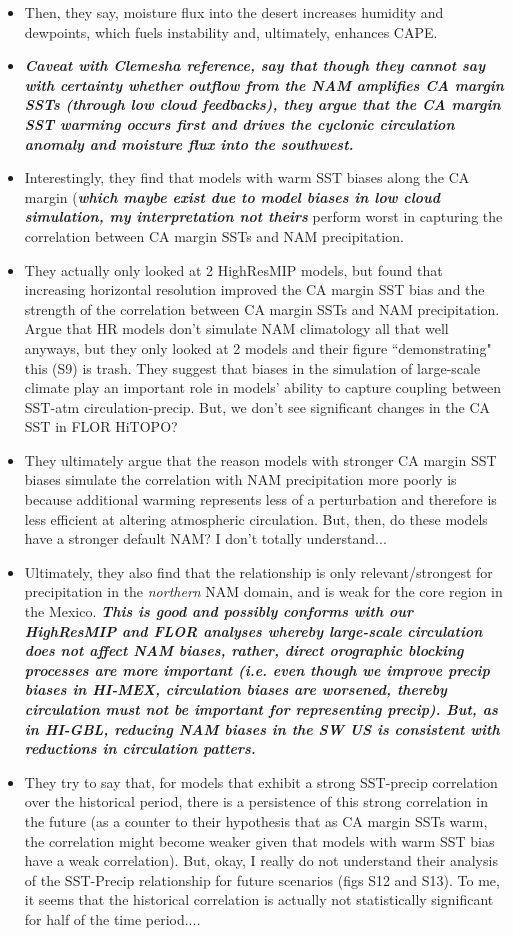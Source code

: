 \documentclass[11pt]{article}
\begin{document}
\begin{itemize}
    \item Then, they say, moisture flux into the desert increases humidity and dewpoints, which fuels instability and, ultimately, enhances CAPE. 
    \item \textbf{\textit{Caveat with Clemesha reference, say that though they cannot say with certainty whether outflow from the NAM amplifies CA margin SSTs (through low cloud feedbacks), they argue that the CA margin SST warming occurs first and drives the cyclonic circulation anomaly and moisture flux into the southwest.}}
    \item Interestingly, they find that models with warm SST biases along the CA margin (\textbf{\textit{which maybe exist due to model biases in low cloud simulation, my interpretation not theirs}} perform worst in capturing the correlation between CA margin SSTs and NAM precipitation.
    \item They actually only looked at 2 HighResMIP models, but found that increasing horizontal resolution improved the CA margin SST bias and the strength of the correlation between CA margin SSTs and NAM precipitation. Argue that HR models don't simulate NAM climatology all that well anyways, but they only looked at 2 models and their figure ``demonstrating" this (S9) is trash. They suggest that biases in the simulation of large-scale climate play an important role in models' ability to capture coupling between SST-atm circulation-precip. But, we don't see significant changes in the CA SST in FLOR HiTOPO?
    \item They ultimately argue that the reason models with stronger CA margin SST biases simulate the correlation with NAM precipitation more poorly is because additional warming represents less of a perturbation and therefore is less efficient at altering atmospheric circulation. But, then, do these models have a stronger default NAM? I don't totally understand...
    \item Ultimately, they also find that the relationship is only relevant/strongest for precipitation in the \textit{northern} NAM domain, and is weak for the core region in the Mexico. \textbf{\textit{This is good and possibly conforms with our HighResMIP and FLOR analyses whereby large-scale circulation does not affect NAM biases, rather, direct orographic blocking processes are more important (i.e. even though we improve precip biases in HI-MEX, circulation biases are worsened, thereby circulation must not be important for representing precip). But, as in HI-GBL, reducing NAM biases in the SW US is consistent with reductions in circulation patters.}}
    \item They try to say that, for models that exhibit a strong SST-precip correlation over the historical period, there is a persistence of this strong correlation in the future (as a counter to their hypothesis that as CA margin SSTs warm, the correlation might become weaker given that models with warm SST bias have a weak correlation). But, okay, I really do not understand their analysis of the SST-Precip relationship for future scenarios (figs S12 and S13). To me, it seems that the historical correlation is actually not statistically significant for half of the time period....
\end{itemize}
\end{document}
